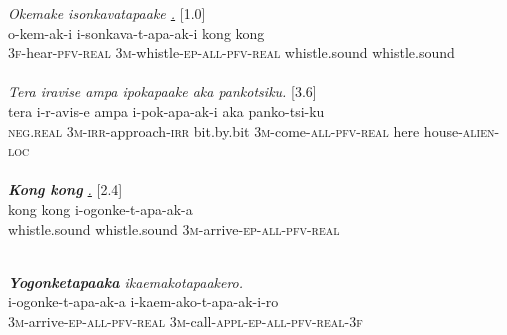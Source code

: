 \documentclass[output=paper]{LSP/langsci}
\begin{document}
\begin{exe}
\ex \label{Em13ad}
\begin{xlist}
\ex \label{Emex:13a}
\glt \textit{ Okemake isonkavatapaake \underline{.}} [1.0]\\
\gll o-kem-ak-i i-sonkava-t-apa-ak-i kong kong\\
 \textsc{3f-}hear\textsc{-pfv-real} \textsc{3m-}whistle\textsc{-ep-all-pfv-real} whistle.sound whistle.sound\\
\glt {}\\
\ex \label{Emex:13b}
\glt \textit{ Tera iravise ampa ipokapaake aka pankotsiku.} [3.6]\\
\gll tera i-r-avis-e ampa i-pok-apa-ak-i aka panko-tsi-ku\\
 \textsc{neg.real} \textsc{3m-irr-}approach\textsc{-irr} bit.by.bit \textsc{3m-}come\textsc{-all-pfv-real} here house\textsc{-alien-loc}\\
\glt {}\\
\ex \label{Emex:13c}
\glt \textit{ \textbf{Kong kong} \underline{.}} [2.4]\\
\gll kong kong i-ogonke-t-apa-ak-a\\
 whistle.sound whistle.sound \textsc{3m-}arrive\textsc{-ep-all-pfv-real}\\
\glt {}\\

\pagebreak

\ex \label{Emex:13d}
\glt \textit{\textbf{Yogonketapaaka} ikaemakotapaakero.}\\
\gll  i-ogonke-t-apa-ak-a i-kaem-ako-t-apa-ak-i-ro \\     	      
   \textsc{3m-}arrive\textsc{-ep-all-pfv-real} \textsc{3m-}call\textsc{-appl-ep-all-pfv-real-3f}\\
\glt {}
\end{xlist}
\end{exe}


%
\end{document}
